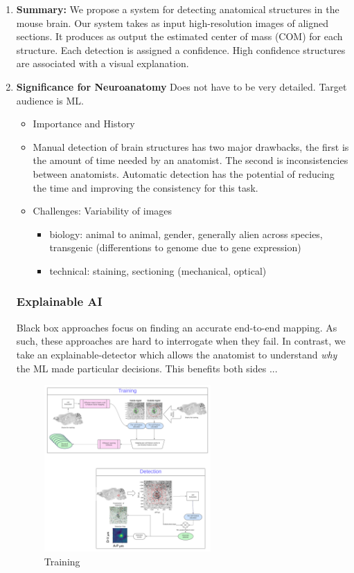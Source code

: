 \documentclass[runningheads]{llncs}
\begin{document}
\begin{enumerate}
\item {\bf Summary:} We propose a system for detecting anatomical structures in the mouse brain. Our system takes as input high-resolution images of aligned sections. It produces as output the estimated center of mass (COM) for each structure. Each detection is assigned a confidence. High confidence structures are associated with a visual explanation.
\item {\bf Significance for Neuroanatomy}
Does not have to be very detailed. Target audience is ML.
\begin{itemize}
\item Importance and History
\item Manual detection of brain structures has two major drawbacks, the first is the amount of time needed by an anatomist. The second is inconsistencies between anatomists. Automatic detection has the potential of reducing the time and improving the consistency for this task.
\item Challenges: Variability of images
    \begin{itemize}
        \item biology: animal to animal, gender, generally alien across species, transgenic (differentions to genome due to gene expression)
        \item technical: staining, sectioning (mechanical, optical)
    \end{itemize}
\end{itemize}
\subsubsection {Explainable AI} Black box approaches focus on finding an accurate end-to-end mapping. As such, these approaches are hard to interrogate when they fail. In contrast, we take an explainable-detector which allows the anatomist to understand {\em why} the ML made particular decisions. This benefits both sides ...

\begin{figure}
  \centering
  \includegraphics[width=0.6\textwidth]{figures/Training.pdf}
  \caption{Training \label{fig:training}}
\end{figure}


\end{enumerate}
\end{document}
